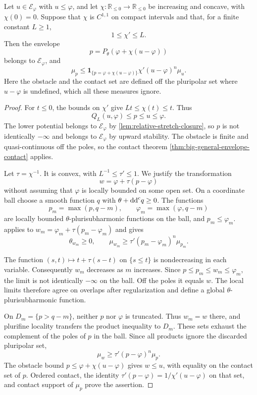 \begin{lemma}\label{lem:big-concave-envelope}\label{lem:big-model-concave-envelope}
Let $u\in\mathcal E_\varphi$ with $u\leq\varphi$, and let
$\chi\colon\mathbb R_{\leq0}\to\mathbb R_{\leq0}$ be increasing and concave, with $\chi(0)=0$. Suppose that $\chi$ is $C^{1,1}$ on compact intervals and that, for a finite constant $L\geq1$,
\[
 1\leq\chi'\leq L.
\]
Then the envelope
\[
 p=P_\theta(\varphi+\chi(u-\varphi))
\]
belongs to $\mathcal E_\varphi$, and
\[
 \mu_p\leq\mathbf1_{\{p=\varphi+\chi(u-\varphi)\}}
                 \chi'(u-\varphi)^n\mu_u.
\]
Here the obstacle and the contact set are defined off the pluripolar set where $u-\varphi$ is undefined, which all these measures ignore.
\end{lemma}
\begin{proof}
For $t\leq0$, the bounds on $\chi'$ give $Lt\leq\chi(t)\leq t$. Thus
\[
 Q_L(u,\varphi)\leq p\leq u\leq\varphi.
\]
The lower potential belongs to $\mathcal E_\varphi$ by \cref{lem:relative-stretch-closure}, so $p$ is not identically $-\infty$ and belongs to $\mathcal E_\varphi$ by upward stability. The obstacle is finite and quasi-continuous off the poles, so the contact theorem \cref{thm:big-general-envelope-contact} applies.

Let $\tau=\chi^{-1}$. It is convex, with $L^{-1}\leq\tau'\leq1$. We justify the transformation
\[
 w=\varphi+\tau(p-\varphi)
\]
without assuming that $\varphi$ is locally bounded on some open set. On a coordinate ball choose a smooth function $q$ with $\theta+\mathrm{dd}^{\mathrm{c}} q\geq0$. The functions
\[
 p_m=\max(p,q-m),\qquad
 \varphi_m=\max(\varphi,q-m)
\]
are locally bounded $\theta$-plurisubharmonic functions on the ball, and $p_m\leq\varphi_m$.  applies to
$w_m=\varphi_m+\tau(p_m-\varphi_m)$ and gives
\[
 \theta_{w_m}\geq0,\qquad
 \mu_{w_m}\geq\tau'(p_m-\varphi_m)^n\mu_{p_m}.
\]

The function $(s,t)\mapsto t+\tau(s-t)$ on $\{s\leq t\}$ is nondecreasing in each variable. Consequently $w_m$ decreases as $m$ increases. Since $p\leq p_m\leq w_m\leq\varphi_m$, the limit is not identically $-\infty$ on the ball. Off the poles it equals $w$. The local limits therefore agree on overlaps after regularization and define a global $\theta$-plurisubharmonic function.

On $D_m=\{p>q-m\}$, neither $p$ nor $\varphi$ is truncated. Thus $w_m=w$ there, and plurifine locality transfers the product inequality to $D_m$. These sets exhaust the complement of the poles of $p$ in the ball. Since all products ignore the discarded pluripolar set,
\[
 \mu_w\geq\tau'(p-\varphi)^n\mu_p.
\]
The obstacle bound $p\leq\varphi+\chi(u-\varphi)$ gives $w\leq u$, with equality on the contact set of $p$. Ordered contact, the identity
$\tau'(p-\varphi)=1/\chi'(u-\varphi)$ on that set, and contact support of $\mu_p$ prove the assertion.
\end{proof}

